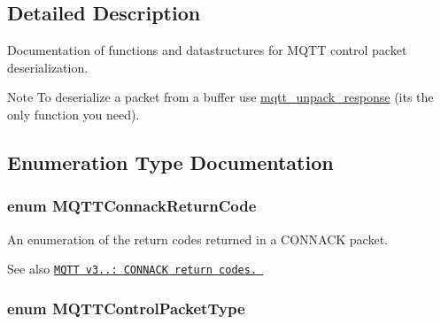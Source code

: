 \subsection{Detailed Description}
Documentation of functions and datastructures for M\+Q\+TT control packet deserialization. 

\begin{DoxyNote}{Note}
To deserialize a packet from a buffer use \hyperlink{group__unpackers_gaae124a93579dcd31e6f52411f4582fbd}{mqtt\+\_\+unpack\+\_\+response} (it\textquotesingle{}s the only function you need). 
\end{DoxyNote}


\subsection{Enumeration Type Documentation}
\subsubsection[{\texorpdfstring{M\+Q\+T\+T\+Connack\+Return\+Code}{MQTTConnackReturnCode}}]{\setlength{\rightskip}{0pt plus 5cm}enum {\bf M\+Q\+T\+T\+Connack\+Return\+Code}}\hypertarget{group__unpackers_ga07e480dfa5738e60c54ad0447ddb1a25}{}\label{group__unpackers_ga07e480dfa5738e60c54ad0447ddb1a25}


An enumeration of the return codes returned in a C\+O\+N\+N\+A\+CK packet. 

\begin{DoxySeeAlso}{See also}
\href{http://docs.oasis-open.org/mqtt/mqtt/v3.1.1/os/mqtt-v3.1.1-os.html#_Table_3.1_-}{\tt M\+Q\+TT v3..\+: C\+O\+N\+N\+A\+CK return codes. } 
\end{DoxySeeAlso}
\subsubsection[{\texorpdfstring{M\+Q\+T\+T\+Control\+Packet\+Type}{MQTTControlPacketType}}]{\setlength{\rightskip}{0pt plus 5cm}enum {\bf M\+Q\+T\+T\+Control\+Packet\+Type}}\hypertarget{group__unpackers_gacbd36b88ec7f62bc161b07e1a0aed679}{}\label{group__unpackers_gacbd36b88ec7f62bc161b07e1a0aed679}


